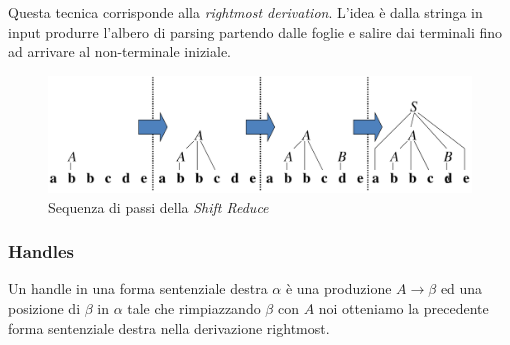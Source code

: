 Questa tecnica corrisponde alla \textit{rightmost derivation}. L'idea \`e
dalla stringa in input produrre l'albero di parsing partendo dalle foglie e
salire dai terminali fino ad arrivare al non-terminale iniziale.

\begin{figure}[H]
\begin{center}
\includegraphics[scale=0.45]{res/image/shift_sequence}
\caption{Sequenza di passi della \textit{Shift Reduce}}
\label{img:shift_sequence}
\end{center}
\end{figure}

\subsubsection{Handles}
\begin{definition}[Handle]
Un handle in una forma sentenziale destra $\alpha$ \`e una produzione $A \to
\beta$ ed una posizione di $\beta$ in $\alpha$ tale che rimpiazzando $\beta$ con
$A$ noi otteniamo la precedente forma sentenziale destra nella derivazione
rightmost.
\end{definition}

